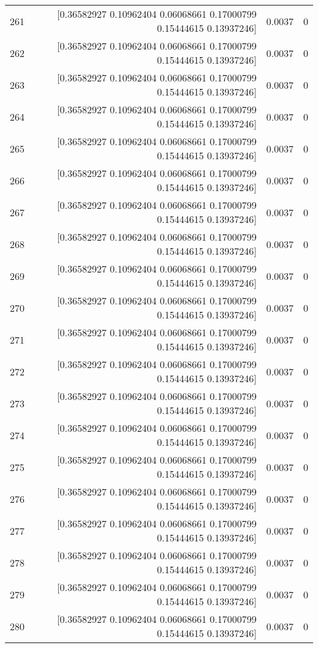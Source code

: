 \begin{longtable}{lrrr}
261 & [0.36582927 0.10962404 0.06068661 0.17000799 0.15444615 0.13937246] & 0.0037 & 0 \\
262 & [0.36582927 0.10962404 0.06068661 0.17000799 0.15444615 0.13937246] & 0.0037 & 0 \\
263 & [0.36582927 0.10962404 0.06068661 0.17000799 0.15444615 0.13937246] & 0.0037 & 0 \\
264 & [0.36582927 0.10962404 0.06068661 0.17000799 0.15444615 0.13937246] & 0.0037 & 0 \\
265 & [0.36582927 0.10962404 0.06068661 0.17000799 0.15444615 0.13937246] & 0.0037 & 0 \\
266 & [0.36582927 0.10962404 0.06068661 0.17000799 0.15444615 0.13937246] & 0.0037 & 0 \\
267 & [0.36582927 0.10962404 0.06068661 0.17000799 0.15444615 0.13937246] & 0.0037 & 0 \\
268 & [0.36582927 0.10962404 0.06068661 0.17000799 0.15444615 0.13937246] & 0.0037 & 0 \\
269 & [0.36582927 0.10962404 0.06068661 0.17000799 0.15444615 0.13937246] & 0.0037 & 0 \\
270 & [0.36582927 0.10962404 0.06068661 0.17000799 0.15444615 0.13937246] & 0.0037 & 0 \\
271 & [0.36582927 0.10962404 0.06068661 0.17000799 0.15444615 0.13937246] & 0.0037 & 0 \\
272 & [0.36582927 0.10962404 0.06068661 0.17000799 0.15444615 0.13937246] & 0.0037 & 0 \\
273 & [0.36582927 0.10962404 0.06068661 0.17000799 0.15444615 0.13937246] & 0.0037 & 0 \\
274 & [0.36582927 0.10962404 0.06068661 0.17000799 0.15444615 0.13937246] & 0.0037 & 0 \\
275 & [0.36582927 0.10962404 0.06068661 0.17000799 0.15444615 0.13937246] & 0.0037 & 0 \\
276 & [0.36582927 0.10962404 0.06068661 0.17000799 0.15444615 0.13937246] & 0.0037 & 0 \\
277 & [0.36582927 0.10962404 0.06068661 0.17000799 0.15444615 0.13937246] & 0.0037 & 0 \\
278 & [0.36582927 0.10962404 0.06068661 0.17000799 0.15444615 0.13937246] & 0.0037 & 0 \\
279 & [0.36582927 0.10962404 0.06068661 0.17000799 0.15444615 0.13937246] & 0.0037 & 0 \\
280 & [0.36582927 0.10962404 0.06068661 0.17000799 0.15444615 0.13937246] & 0.0037 & 0 \\

\end{longtable}
